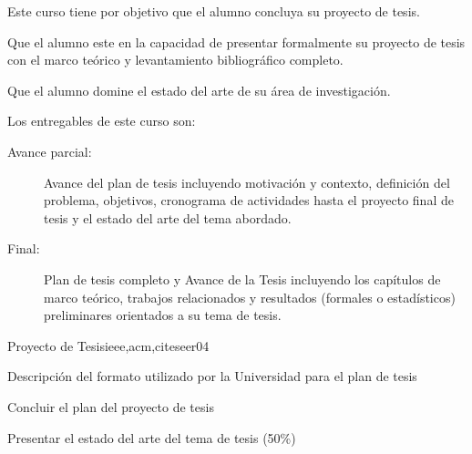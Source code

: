 \begin{syllabus}


\begin{justification}
Este curso tiene por objetivo que el alumno concluya su proyecto de tesis.
\end{justification}

\begin{goals}
\item Que el alumno este en la capacidad de presentar formalmente su proyecto de tesis con el marco teórico y levantamiento bibliográfico completo.
\item Que el alumno domine el estado del arte de su área de investigación.
\item Los entregables de este curso son:
	\begin{description}
	\item [Avance parcial:] Avance del plan de tesis incluyendo motivación y contexto, definición del problema, objetivos, cronograma de actividades hasta el proyecto final de tesis y el estado del arte del tema abordado.
	\item [Final:] Plan de tesis completo y Avance de la Tesis incluyendo los capítulos de marco teórico, trabajos relacionados y resultados (formales o estadísticos) preliminares orientados a su tema de tesis.
	\end{description}
\end{goals}

\begin{outcomes}
\end{outcomes}

\begin{unit}{Proyecto de Tesis}{ieee,acm,citeseer}{0}{4}
\begin{unitgoals}
      \item Descripción del formato utilizado por la Universidad para el plan de tesis 
      \item Concluir el plan del proyecto de tesis
      \item Presentar el estado del arte del tema de tesis (50\%)
   \end{unitgoals}
\end{unit}


\end{syllabus}
